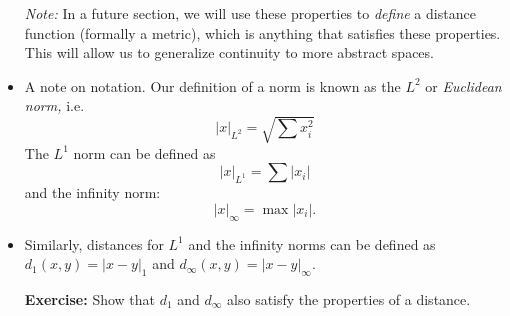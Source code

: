 \begin{itemize}
    \textit{Note:} In a future section, we will use these properties to \textit{define} a distance function (formally a metric), which is anything that satisfies these properties. This will allow us to generalize continuity to more abstract spaces.
    \item A note on notation. Our definition of a norm is known as the $L^2$ or \textit{Euclidean norm,} i.e.
    \begin{equation}
        |x|_{L^2} = \sqrt{\sum x_i^2}
    \end{equation}
    The $L^1$ norm can be defined as
    \begin{equation}
        |x|_{L^1} = \sum |x_i|
    \end{equation}
    and the infinity norm: 
    \begin{equation}
        |x|_\infty = \max|x_i|.
    \end{equation}
    \item Similarly, distances for $L^1$ and the infinity norms can be defined as $d_1(x,y)=|x-y|_1$ and $d_\infty(x,y)=|x-y|_\infty$.
    
    \textbf{Exercise:} Show that $d_1$ and $d_\infty$ also satisfy the properties of a distance.
\end{itemize}